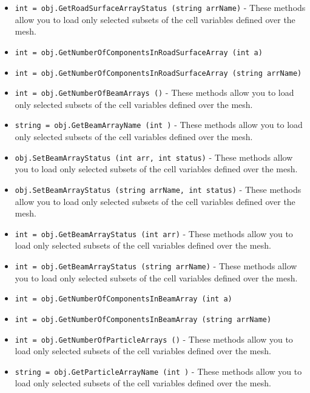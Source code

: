 \begin{itemize}
\item  \verb|int = obj.GetRoadSurfaceArrayStatus (string arrName)| -  These methods allow you to load only selected subsets of the cell
 variables defined over the mesh.

\item  \verb|int = obj.GetNumberOfComponentsInRoadSurfaceArray (int a)|

\item  \verb|int = obj.GetNumberOfComponentsInRoadSurfaceArray (string arrName)|

\item  \verb|int = obj.GetNumberOfBeamArrays ()| -  These methods allow you to load only selected subsets of the cell
 variables defined over the mesh.

\item  \verb|string = obj.GetBeamArrayName (int )| -  These methods allow you to load only selected subsets of the cell
 variables defined over the mesh.

\item  \verb|obj.SetBeamArrayStatus (int arr, int status)| -  These methods allow you to load only selected subsets of the cell
 variables defined over the mesh.

\item  \verb|obj.SetBeamArrayStatus (string arrName, int status)| -  These methods allow you to load only selected subsets of the cell
 variables defined over the mesh.

\item  \verb|int = obj.GetBeamArrayStatus (int arr)| -  These methods allow you to load only selected subsets of the cell
 variables defined over the mesh.

\item  \verb|int = obj.GetBeamArrayStatus (string arrName)| -  These methods allow you to load only selected subsets of the cell
 variables defined over the mesh.

\item  \verb|int = obj.GetNumberOfComponentsInBeamArray (int a)|

\item  \verb|int = obj.GetNumberOfComponentsInBeamArray (string arrName)|

\item  \verb|int = obj.GetNumberOfParticleArrays ()| -  These methods allow you to load only selected subsets of the cell
 variables defined over the mesh.

\item  \verb|string = obj.GetParticleArrayName (int )| -  These methods allow you to load only selected subsets of the cell
 variables defined over the mesh.


\end{itemize}
